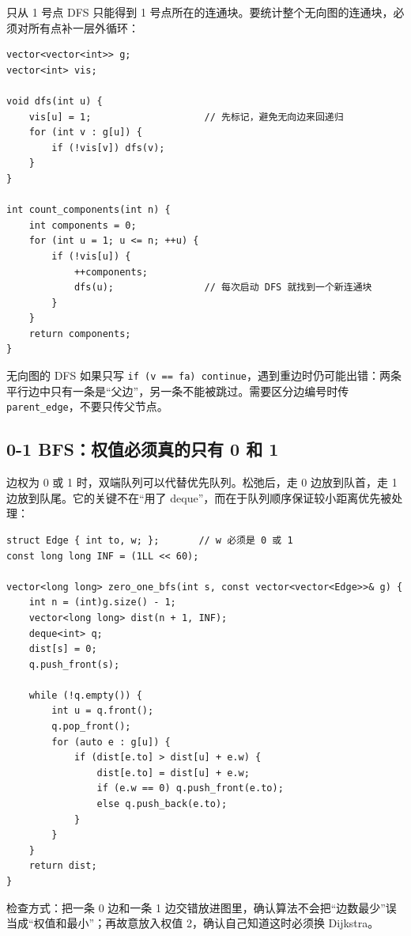 \documentclass[UTF8,openany,oneside,zihao=-4]{ctexbook}
\begin{document}
只从 1 号点 DFS 只能得到 1 号点所在的连通块。要统计整个无向图的连通块，必须对所有点补一层外循环：

\begin{lstlisting}
vector<vector<int>> g;
vector<int> vis;

void dfs(int u) {
    vis[u] = 1;                    // 先标记，避免无向边来回递归
    for (int v : g[u]) {
        if (!vis[v]) dfs(v);
    }
}

int count_components(int n) {
    int components = 0;
    for (int u = 1; u <= n; ++u) {
        if (!vis[u]) {
            ++components;
            dfs(u);                // 每次启动 DFS 就找到一个新连通块
        }
    }
    return components;
}
\end{lstlisting}

\begin{warn}
 无向图的 DFS 如果只写 \lstinline|if (v == fa) continue|，遇到重边时仍可能出错：两条平行边中只有一条是“父边”，另一条不能被跳过。需要区分边编号时传 \lstinline|parent_edge|，不要只传父节点。
\end{warn}

\subsection{0-1 BFS：权值必须真的只有 0 和 1}

边权为 0 或 1 时，双端队列可以代替优先队列。松弛后，走 0 边放到队首，走 1 边放到队尾。它的关键不在“用了 deque”，而在于队列顺序保证较小距离优先被处理：

\begin{lstlisting}
struct Edge { int to, w; };       // w 必须是 0 或 1
const long long INF = (1LL << 60);

vector<long long> zero_one_bfs(int s, const vector<vector<Edge>>& g) {
    int n = (int)g.size() - 1;
    vector<long long> dist(n + 1, INF);
    deque<int> q;
    dist[s] = 0;
    q.push_front(s);

    while (!q.empty()) {
        int u = q.front();
        q.pop_front();
        for (auto e : g[u]) {
            if (dist[e.to] > dist[u] + e.w) {
                dist[e.to] = dist[u] + e.w;
                if (e.w == 0) q.push_front(e.to);
                else q.push_back(e.to);
            }
        }
    }
    return dist;
}
\end{lstlisting}

检查方式：把一条 0 边和一条 1 边交错放进图里，确认算法不会把“边数最少”误当成“权值和最小”；再故意放入权值 2，确认自己知道这时必须换 Dijkstra。
\end{document}
